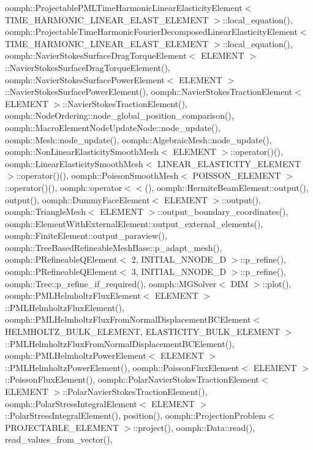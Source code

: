oomph\+::\+Projectable\+P\+M\+L\+Time\+Harmonic\+Linear\+Elasticity\+Element$<$ T\+I\+M\+E\+\_\+\+H\+A\+R\+M\+O\+N\+I\+C\+\_\+\+L\+I\+N\+E\+A\+R\+\_\+\+E\+L\+A\+S\+T\+\_\+\+E\+L\+E\+M\+E\+N\+T $>$\+::local\+\_\+equation(), oomph\+::\+Projectable\+Time\+Harmonic\+Fourier\+Decomposed\+Linear\+Elasticity\+Element$<$ T\+I\+M\+E\+\_\+\+H\+A\+R\+M\+O\+N\+I\+C\+\_\+\+L\+I\+N\+E\+A\+R\+\_\+\+E\+L\+A\+S\+T\+\_\+\+E\+L\+E\+M\+E\+N\+T $>$\+::local\+\_\+equation(), oomph\+::\+Navier\+Stokes\+Surface\+Drag\+Torque\+Element$<$ E\+L\+E\+M\+E\+N\+T $>$\+::\+Navier\+Stokes\+Surface\+Drag\+Torque\+Element(), oomph\+::\+Navier\+Stokes\+Surface\+Power\+Element$<$ E\+L\+E\+M\+E\+N\+T $>$\+::\+Navier\+Stokes\+Surface\+Power\+Element(), oomph\+::\+Navier\+Stokes\+Traction\+Element$<$ E\+L\+E\+M\+E\+N\+T $>$\+::\+Navier\+Stokes\+Traction\+Element(), oomph\+::\+Node\+Ordering\+::node\+\_\+global\+\_\+position\+\_\+comparison(), oomph\+::\+Macro\+Element\+Node\+Update\+Node\+::node\+\_\+update(), oomph\+::\+Mesh\+::node\+\_\+update(), oomph\+::\+Algebraic\+Mesh\+::node\+\_\+update(), oomph\+::\+Non\+Linear\+Elasticity\+Smooth\+Mesh$<$ E\+L\+E\+M\+E\+N\+T $>$\+::operator()(), oomph\+::\+Linear\+Elasticity\+Smooth\+Mesh$<$ L\+I\+N\+E\+A\+R\+\_\+\+E\+L\+A\+S\+T\+I\+C\+I\+T\+Y\+\_\+\+E\+L\+E\+M\+E\+N\+T $>$\+::operator()(), oomph\+::\+Poisson\+Smooth\+Mesh$<$ P\+O\+I\+S\+S\+O\+N\+\_\+\+E\+L\+E\+M\+E\+N\+T $>$\+::operator()(), oomph\+::operator$<$$<$(), oomph\+::\+Hermite\+Beam\+Element\+::output(), output(), oomph\+::\+Dummy\+Face\+Element$<$ E\+L\+E\+M\+E\+N\+T $>$\+::output(), oomph\+::\+Triangle\+Mesh$<$ E\+L\+E\+M\+E\+N\+T $>$\+::output\+\_\+boundary\+\_\+coordinates(), oomph\+::\+Element\+With\+External\+Element\+::output\+\_\+external\+\_\+elements(), oomph\+::\+Finite\+Element\+::output\+\_\+paraview(), oomph\+::\+Tree\+Based\+Refineable\+Mesh\+Base\+::p\+\_\+adapt\+\_\+mesh(), oomph\+::\+P\+Refineable\+Q\+Element$<$ 2, I\+N\+I\+T\+I\+A\+L\+\_\+\+N\+N\+O\+D\+E\+\_\+D $>$\+::p\+\_\+refine(), oomph\+::\+P\+Refineable\+Q\+Element$<$ 3, I\+N\+I\+T\+I\+A\+L\+\_\+\+N\+N\+O\+D\+E\+\_\+D $>$\+::p\+\_\+refine(), oomph\+::\+Tree\+::p\+\_\+refine\+\_\+if\+\_\+required(), oomph\+::\+M\+G\+Solver$<$ D\+I\+M $>$\+::plot(), oomph\+::\+P\+M\+L\+Helmholtz\+Flux\+Element$<$ E\+L\+E\+M\+E\+N\+T $>$\+::\+P\+M\+L\+Helmholtz\+Flux\+Element(), oomph\+::\+P\+M\+L\+Helmholtz\+Flux\+From\+Normal\+Displacement\+B\+C\+Element$<$ H\+E\+L\+M\+H\+O\+L\+T\+Z\+\_\+\+B\+U\+L\+K\+\_\+\+E\+L\+E\+M\+E\+N\+T, E\+L\+A\+S\+T\+I\+C\+I\+T\+Y\+\_\+\+B\+U\+L\+K\+\_\+\+E\+L\+E\+M\+E\+N\+T $>$\+::\+P\+M\+L\+Helmholtz\+Flux\+From\+Normal\+Displacement\+B\+C\+Element(), oomph\+::\+P\+M\+L\+Helmholtz\+Power\+Element$<$ E\+L\+E\+M\+E\+N\+T $>$\+::\+P\+M\+L\+Helmholtz\+Power\+Element(), oomph\+::\+Poisson\+Flux\+Element$<$ E\+L\+E\+M\+E\+N\+T $>$\+::\+Poisson\+Flux\+Element(), oomph\+::\+Polar\+Navier\+Stokes\+Traction\+Element$<$ E\+L\+E\+M\+E\+N\+T $>$\+::\+Polar\+Navier\+Stokes\+Traction\+Element(), oomph\+::\+Polar\+Stress\+Integral\+Element$<$ E\+L\+E\+M\+E\+N\+T $>$\+::\+Polar\+Stress\+Integral\+Element(), position(), oomph\+::\+Projection\+Problem$<$ P\+R\+O\+J\+E\+C\+T\+A\+B\+L\+E\+\_\+\+E\+L\+E\+M\+E\+N\+T $>$\+::project(), oomph\+::\+Data\+::read(), read\+\_\+values\+\_\+from\+\_\+vector(), 